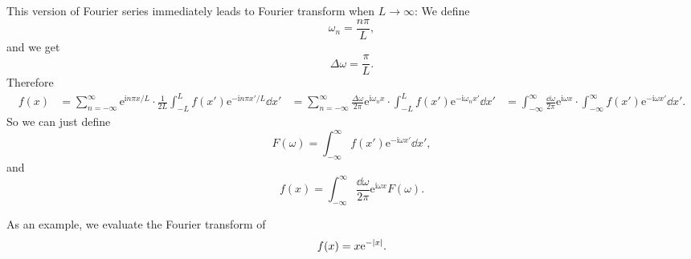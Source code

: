 \documentclass[hyperref, a4paper]{article}
\newcommand*{\ii}{\mathrm{i}}
\newcommand*{\ee}{\mathrm{e}}
\def\\{}%
\begin{document}
This version of Fourier series immediately leads to Fourier transform when $L \to \infty$:
We define 
\begin{equation}
    \omega_n = \frac{n \pi}{L}, 
\end{equation}
and we get 
\begin{equation}
    \Delta \omega = \frac{\pi}{L}.
\end{equation}
Therefore 
\[
    \begin{aligned}
        f(x) &= \sum_{n=-\infty}^{\infty} \ee^{\ii n \pi x / L} \cdot \frac{1}{2L} 
            \int_{-L}^{L} f(x') \ee^{- \ii n \pi x' / L} \dd{x'} \\
            &= \sum_{n=-\infty}^{\infty} \frac{\Delta \omega}{2\pi} \ee^{\ii \omega_n x} \cdot  
            \int_{-L}^{L} f(x') \ee^{- \ii \omega_n x' } \dd{x'} \\
            &= \int_{-\infty}^{\infty} \frac{\dd{\omega}}{2\pi} \ee^{\ii \omega x} \cdot 
            \int_{-\infty}^{\infty} f(x') \ee^{- \ii \omega x'} \dd{x'}.
    \end{aligned}
\]
So we can just define 
\begin{equation}
    F(\omega) = \int_{-\infty}^{\infty} f(x') \ee^{- \ii \omega x'} \dd{x'},
\end{equation}
and 
\begin{equation}
    f(x) =\int_{-\infty}^{\infty} \frac{\dd{\omega}}{2\pi} \ee^{\ii \omega x} F(\omega).
\end{equation}

As an example, we evaluate the Fourier transform of 
\begin{equation}
    f(x) = x \ee^{- \abs*{x}}.
\end{equation}
\end{document}
